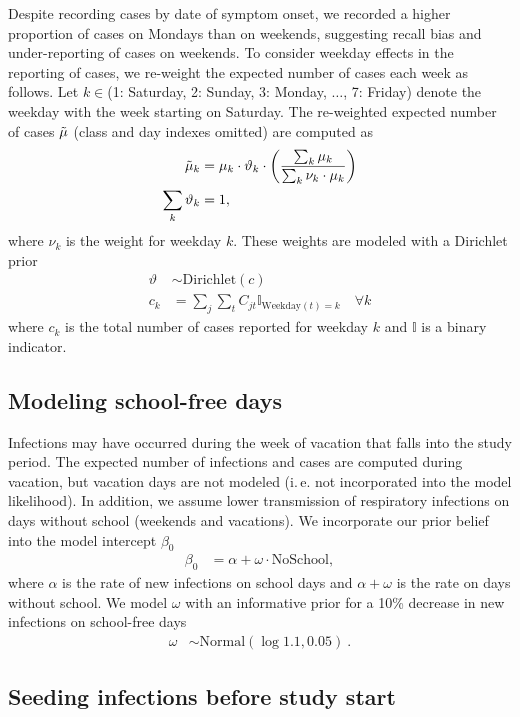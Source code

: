 \documentclass[fleqn,11pt]{wlscirep_supp}
\newcommand\ie{i.\,e.\xspace}
\begin{document}
Despite recording cases by date of symptom onset, we recorded a higher proportion of cases on Mondays than on weekends, suggesting recall bias and under-reporting of cases on weekends. To consider weekday effects in the reporting of cases, we re-weight the expected number of cases each week as follows. Let $k \in $(1: Saturday, 2: Sunday, 3: Monday, $\dots$, 7: Friday) denote the weekday with the week starting on Saturday. The re-weighted expected number of cases $\Tilde{\mu}$ (class and day indexes omitted) are computed as
\begin{align*}
    \Tilde{\mu}_{k} &= \mu_k \cdot \vartheta_k \cdot \left(\frac{\sum_k \mu_k}{\sum_k \nu_k \cdot \mu_k}\right)\\
    \sum_k \vartheta_k &= 1,
\end{align*}
where $\nu_k$ is the weight for weekday $k$. These weights are modeled with a Dirichlet prior
\begin{align*}
    \vartheta &\sim \text{Dirichlet}(c) \\
    c_k &= \sum_j \sum_t C_{jt} \mathbb{I}_{\text{Weekday}(t)=k} \quad \forall k
\end{align*}
where $c_k$ is the total number of cases reported for weekday $k$ and $\mathbb{I}$ is a binary indicator. 

\subsection{Modeling school-free days}

Infections may have occurred during the week of vacation that falls into the study period. The expected number of infections and cases are computed during vacation, but vacation days are not modeled (\ie not incorporated into the model likelihood). In addition, we assume lower transmission of respiratory infections on days without school (weekends and vacations). We incorporate our prior belief into the model intercept $\beta_0$  
\begin{align*}
    \beta_0 &= \alpha + \omega \cdot \text{NoSchool},
\end{align*}
where $\alpha$ is the rate of new infections on school days and $\alpha + \omega$ is the rate on days without school. We model $\omega$ with an informative prior for a 10\% decrease in new infections on school-free days
\begin{align*}
    \omega &\sim \text{Normal}(\log 1.1, 0.05)~.
\end{align*}

\subsection{Seeding infections before study start}
\end{document}

